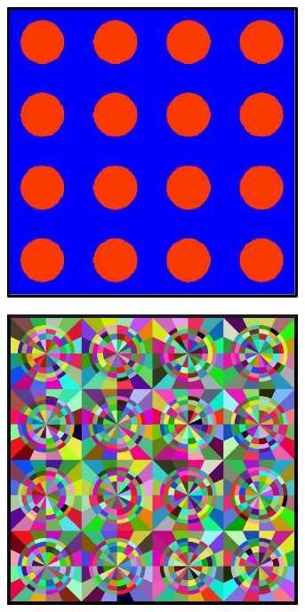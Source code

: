 \begin{figure}[h!]
  \begin{subfigure}[htb!]{0.32\textwidth}
    \centering
    \includegraphics[width=0.95\textwidth]{figures/workflow/openmoc/materials-border}
    \label{fig:moc-model-materials}
    \caption{}
  \end{subfigure}
  \begin{subfigure}[htb!]{0.32\textwidth}
    \centering
    \includegraphics[width=0.95\textwidth]{figures/workflow/openmoc/FSRs}

\end{subfigure}
\end{figure}
